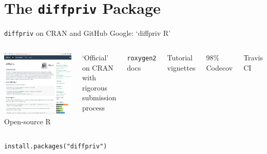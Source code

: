 \documentclass{beamer}
\newcommand{\code}[1]{\texttt{#1}\xspace}
\newcommand{\pck}{\code{diffpriv}}
\begin{document}
\section{The \pck Package}

\begin{frame}{\pck on CRAN and GitHub \hfill \alert{Google: `diffpriv R'}}

\newcommand{\lb}{\linebreak[4]\vspace{-0.2em}}

	\begin{columns}[T,onlytextwidth]
			\includegraphics[width=0.95\columnwidth]{figures/screenshot-homepage}
			Open-source R  \lb

			`Official' on CRAN with rigorous submission process \lb

			\code{roxygen2} docs \lb

			Tutorial vignettes \lb

			98\% Codecov \lb

			Travis CI
	\end{columns}

\end{frame}

\begin{frame}[standout]
\code{install.packages("diffpriv")}
\end{frame}
\end{document}
